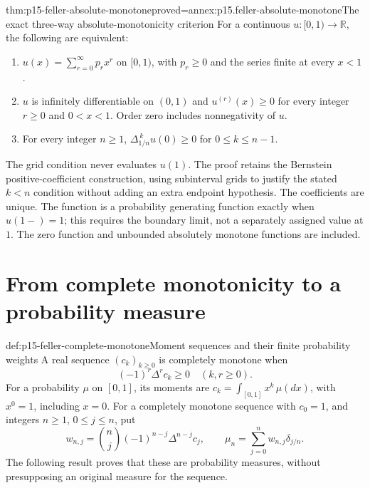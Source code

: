 \begin{hbtheorem}{thm:p15-feller-absolute-monotone}{proved=annex:p15.feller-absolute-monotone}{The exact three-way absolute-monotonicity criterion}
For a continuous \(u:[0,1)\to\mathbb R\), the following are equivalent:
\begin{enumerate}
\item \(u(x)=\sum_{r=0}^\infty p_rx^r\) on \([0,1)\), with
      \(p_r\geq0\) and the series finite at every \(x<1\).
\item \(u\) is infinitely differentiable on \((0,1)\) and
      \(u^{(r)}(x)\geq0\) for every integer \(r\geq0\) and \(0<x<1\).
      Order zero includes nonnegativity of \(u\).
\item For every integer \(n\geq1\),
      \(\Delta_{1/n}^{\,k}u(0)\geq0\) for \(0\leq k\leq n-1\).
\end{enumerate}
The grid condition never evaluates \(u(1)\).
The proof retains the Bernstein positive-coefficient construction,
using subinterval grids to justify the stated \(k<n\) condition
without adding an extra endpoint hypothesis.
The coefficients are unique. The function is a probability generating
function exactly when \(u(1-)=1\); this requires the boundary limit,
not a separately assigned value at \(1\).
The zero function and unbounded absolutely monotone functions are included.
\end{hbtheorem}

\section{From complete monotonicity to a probability measure}

\begin{hbdefinition}{def:p15-feller-complete-monotone}{Moment sequences and their finite probability weights}
A real sequence \((c_k)_{k\geq0}\) is completely monotone when
\[
                         (-1)^r\Delta^r c_k\geq0
                                            \quad(k,r\geq0).
\]
For a probability \(\mu\) on \([0,1]\), its moments are
\(c_k=\int_{[0,1]}x^k\,\mu(dx)\), with \(x^0=1\), including \(x=0\).
For a completely monotone sequence with \(c_0=1\), and integers
\(n\geq1\), \(0\leq j\leq n\), put
\[
 w_{n,j}=\binom nj(-1)^{n-j}\Delta^{n-j}c_j,\qquad
 \mu_n=\sum_{j=0}^n w_{n,j}\delta_{j/n}.
\]
The following result proves that these are probability measures,
without presupposing an original measure for the sequence.
\end{hbdefinition}

